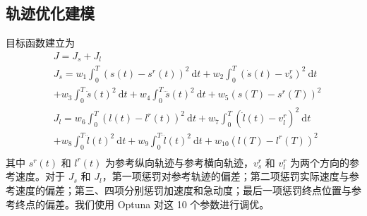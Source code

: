\documentclass[UTF8,a4paper,12pt,fontset=none]{ctexart}
\theoremstyle{definition}
\theoremstyle{plain}
\theoremstyle{plain}
\theoremstyle{plain}
\begin{document}
\subsection{轨迹优化建模}
目标函数建立为
\begin{equation}
 \begin{aligned}
&J = J_s + J_l\\
&J_s = w_{1} \int_{0}^{T}\left(s(t)-s^{r}(t)\right)^{2} \mathrm{~d} t+w_{2} \int_{0}^{T}\left(\dot{s}(t)-v_{s}^{r}\right)^{2} \mathrm{~d} t \\
&+w_{3} \int_{0}^{T} \ddot{s}(t)^{2} \mathrm{~d} t+w_{4} \int_{0}^{T} \dddot{s}(t)^{2} \mathrm{~d} t+w_{5}\left(s(T)-s^{r}(T)\right)^{2}\\
&J_l = w_{6} \int_{0}^{T}\left(l(t)-l^{r}(t)\right)^{2} \mathrm{~d} t+w_{7} \int_{0}^{T}\left(\dot{l}(t)-v_{l}^{r}\right)^{2} \mathrm{~d} t \\
&+w_{8} \int_{0}^{T} \ddot{l}(t)^{2} \mathrm{~d} t+w_{9} \int_{0}^{T} \dddot{l}(t)^{2} \mathrm{~d} t+w_{10}\left(l(T)-l^{r}(T)\right)^{2}\\
\end{aligned}
\end{equation}
其中 $s^{r}(t)$ 和 $l^{r}(t)$ 为参考纵向轨迹与参考横向轨迹，$v^{r}_s$ 和 $v^{r}_l$ 为两个方向的参考速度。对于 $J_s$ 和 $J_l$，第一项惩罚对参考轨迹的偏差；第二项惩罚实际速度与参考速度的偏差；第三、四项分别惩罚加速度和急动度；最后一项惩罚终点位置与参考终点的偏差。我们使用 Optuna\cite{optuna_2019} 对这 10 个参数进行调优。%
\end{document}
